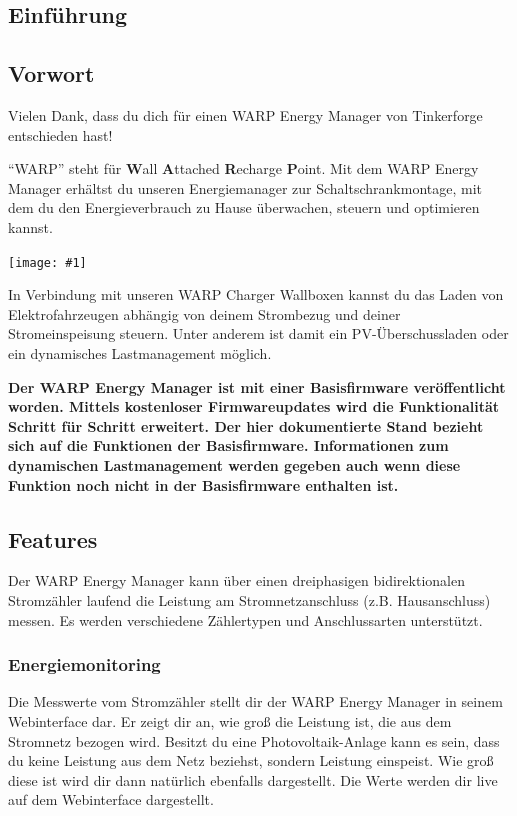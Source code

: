 \documentclass[a4paper,10pt]{article}
\newcommand{\gfx}[1]{\texttt{[image: \#1]}}
\begin{document}
\begin{multicols*}{2}
	\tableofcontents
	\newpage
	\section{Einführung}
	\subsection{Vorwort} Vielen Dank, dass du
	dich für einen WARP Energy Manager von Tinkerforge entschieden hast!

	\enquote{WARP} steht
	für \textbf{W}all \textbf{A}ttached
	\textbf{R}echarge \textbf{P}oint. Mit dem WARP Energy Manager
	erhältst du unseren Energiemanager zur Schaltschrankmontage, mit dem du den
	Energieverbrauch zu Hause überwachen, steuern und optimieren kannst. 

	\gfx{./img/resized/warp-energy-manager.png}\vspace{-0.3cm}

	In Verbindung mit unseren WARP Charger Wallboxen kannst du das Laden von
	Elektrofahrzeugen abhängig von deinem Strombezug und deiner Stromeinspeisung steuern.
	Unter anderem ist damit ein PV-Überschussladen oder ein dynamisches
	Lastmanagement möglich.

	\textbf{Der WARP Energy Manager ist mit einer Basisfirmware veröffentlicht
	worden. Mittels kostenloser Firmwareupdates wird die Funktionalität Schritt
	für Schritt erweitert. Der hier dokumentierte Stand bezieht sich auf die
	Funktionen der Basisfirmware. Informationen zum dynamischen Lastmanagement
	werden gegeben auch wenn diese Funktion noch nicht in der Basisfirmware
	enthalten ist.}

	\subsection{Features}
	\vspace{-0.1cm}
	Der WARP Energy Manager kann über einen dreiphasigen bidirektionalen 
	Stromzähler laufend die Leistung am Stromnetzanschluss (z.B. Hausanschluss)
	messen. Es werden verschiedene Zählertypen und Anschlussarten unterstützt.

	\subsubsection{Energiemonitoring}
	Die Messwerte vom Stromzähler stellt dir der WARP Energy Manager in seinem
	Webinterface dar. Er zeigt dir an, wie groß die Leistung ist, die aus dem Stromnetz
	bezogen wird. Besitzt du eine Photovoltaik-Anlage kann es sein, dass du
	keine Leistung aus dem Netz beziehst, sondern Leistung einspeist. 
	Wie groß diese ist wird dir dann natürlich ebenfalls dargestellt. Die Werte
	werden dir live auf dem Webinterface dargestellt.


\end{multicols*}
\end{document}

